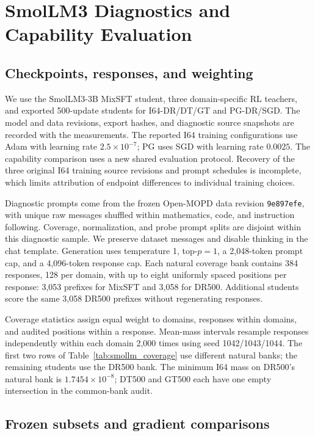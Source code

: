 \section{SmolLM3 Diagnostics and Capability Evaluation}
\label{app:smollm_diagnostics}

\subsection{Checkpoints, responses, and weighting}

We use the SmolLM3-3B MixSFT student, three domain-specific RL teachers, and exported 500-update students for I64-DR/DT/GT and PG-DR/SGD. The model and data revisions, export hashes, and diagnostic source snapshots are recorded with the measurements. The reported I64 training configurations use Adam with learning rate $2.5\times10^{-7}$; PG uses SGD with learning rate $0.0025$. The capability comparison uses a new shared evaluation protocol. Recovery of the three original I64 training source revisions and prompt schedules is incomplete, which limits attribution of endpoint differences to individual training choices.

Diagnostic prompts come from the frozen Open-MOPD data revision \texttt{9e897efe}, with unique raw messages shuffled within mathematics, code, and instruction following. Coverage, normalization, and probe prompt splits are disjoint within this diagnostic sample. We preserve dataset messages and disable thinking in the chat template. Generation uses temperature 1, top-$p=1$, a 2,048-token prompt cap, and a 4,096-token response cap. Each natural coverage bank contains 384 responses, 128 per domain, with up to eight uniformly spaced positions per response: 3,053 prefixes for MixSFT and 3,058 for DR500. Additional students score the same 3,058 DR500 prefixes without regenerating responses.

Coverage statistics assign equal weight to domains, responses within domains, and audited positions within a response. Mean-mass intervals resample responses independently within each domain 2,000 times using seed 1042/1043/1044. The first two rows of Table~\ref{tab:smollm_coverage} use different natural banks; the remaining students use the DR500 bank. The minimum I64 mass on DR500's natural bank is $1.7454\times10^{-8}$; DT500 and GT500 each have one empty intersection in the common-bank audit.



\subsection{Frozen subsets and gradient comparisons}

